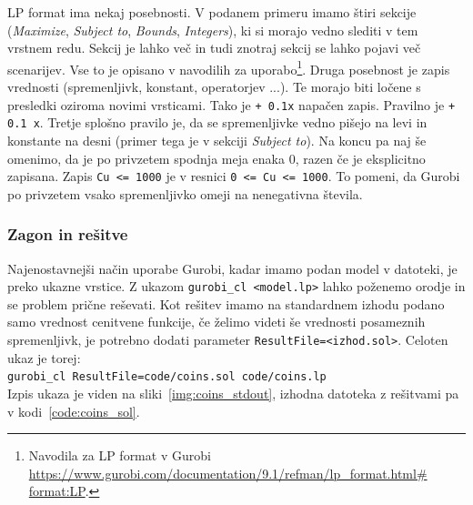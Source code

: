 \documentclass[a4paper,11pt]{article}
\begin{document}


LP format ima nekaj posebnosti. V podanem primeru imamo štiri sekcije (\textit{Maximize}, \textit{Subject to}, \textit{Bounds}, \textit{Integers}), ki si morajo vedno slediti v tem vrstnem redu. Sekcij je lahko več in tudi znotraj sekcij se lahko pojavi  več scenarijev. Vse to je opisano v navodilih za uporabo\footnote{Navodila za LP format v Gurobi \url{https://www.gurobi.com/documentation/9.1/refman/lp_format.html\# format:LP}.}. Druga posebnost je zapis vrednosti (spremenljivk, konstant, operatorjev ...). Te morajo biti ločene s presledki oziroma novimi vrsticami. Tako je \texttt{+ 0.1x} napačen zapis. Pravilno je  \texttt{+ 0.1 x}. Tretje splošno pravilo je, da se spremenljivke vedno pišejo na levi in konstante na desni (primer tega je v sekciji \textit{Subject to}). Na koncu pa naj še omenimo, da je po privzetem spodnja meja enaka 0, razen če je eksplicitno zapisana. Zapis \texttt{Cu <= 1000} je v resnici \texttt{0 <= Cu <= 1000}. To pomeni, da Gurobi po privzetem vsako spremenljivko omeji na nenegativna števila.

\subsubsection{Zagon in rešitve}

Najenostavnejši način uporabe Gurobi, kadar imamo podan model v datoteki, je preko ukazne vrstice. Z ukazom \texttt{gurobi\_cl \textless model.lp\textgreater} lahko poženemo orodje in se problem prične reševati. Kot rešitev imamo na standardnem izhodu podano samo vrednost cenitvene funkcije, če želimo videti še vrednosti posameznih spremenljivk, je potrebno dodati parameter \texttt{ResultFile=<izhod.sol>}. Celoten ukaz je torej: \\
\texttt{gurobi\_cl ResultFile=code/coins.sol code/coins.lp}\\
Izpis ukaza je viden na sliki~\ref{img:coins_stdout}, izhodna datoteka z rešitvami pa v kodi~\ref{code:coins_sol}.
\end{document}
